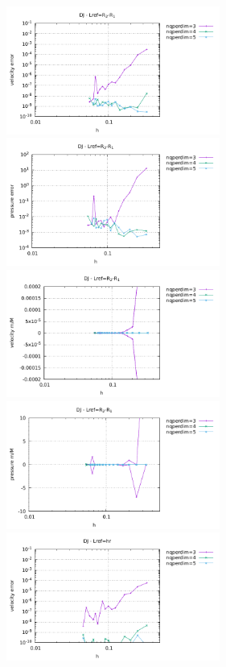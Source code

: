 \begin{center}
\includegraphics[width=7cm]{python_codes/fieldstone_133/results/bench3/DJ_Lref_R21/errors_v.pdf}
\includegraphics[width=7cm]{python_codes/fieldstone_133/results/bench3/DJ_Lref_R21/errors_p.pdf}\\
\includegraphics[width=7cm]{python_codes/fieldstone_133/results/bench3/DJ_Lref_R21/vel_stats.pdf}
\includegraphics[width=7cm]{python_codes/fieldstone_133/results/bench3/DJ_Lref_R21/press_stats.pdf}\\
\includegraphics[width=7cm]{python_codes/fieldstone_133/results/bench3/DJ_Lref_hr/errors_v.pdf}

\end{center}
